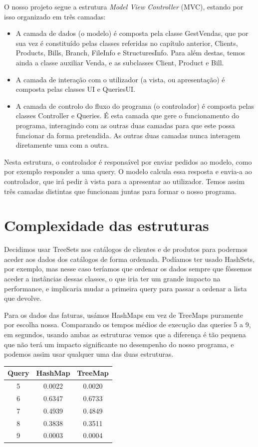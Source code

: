 \documentclass[a4paper]{report}
\begin{document}
	O nosso projeto segue a estrutura \textit{Model View Controller} (MVC), estando por isso organizado em três camadas:
	\begin{itemize}
		\item A camada de dados (o modelo) é composta pela classe GestVendas, que por sua vez é constituído pelas classes referidas no capítulo anterior, Clients, Products, Bills, Branch, FileInfo e StructuresInfo. Para além destas, temos ainda a classe auxiliar Venda, e as subclasses Client, Product e Bill.
		\item A camada de interação com o utilizador (a vista, ou apresentação) é composta pelas classes UI e QueriesUI.
		\item A camada de controlo do fluxo do programa (o controlador) é composta pelas classes Controller e Queries. É esta camada que gere o funcionamento do programa, interagindo com as outras duas camadas para que este possa funcionar da forma pretendida. As outras duas camadas nunca interagem diretamente uma com a outra.
	\end{itemize}
	Nesta estrutura, o controlador é responsável por enviar pedidos ao modelo, como por exemplo responder a uma query. O modelo calcula essa resposta e envia-a ao controlador, que irá pedir à vista para a apresentar ao utilizador. Temos assim três camadas distintas que funcionam juntas para formar o nosso programa.

	\chapter{Complexidade das estruturas}
	
	Decidimos usar TreeSets nos catálogos de clientes e de produtos para podermos aceder aos dados dos catálogos de forma ordenada. Podíamos ter usado HashSets, por exemplo, mas nesse caso teríamos que ordenar os dados sempre que fôssemos aceder a instâncias dessas classes, o que iria ter um grande impacto na performance, e implicaria mudar a primeira query para passar a ordenar a lista que devolve.
	
	Para os dados das faturas, usámos HashMaps em vez de TreeMaps puramente por escolha nossa. Comparando os tempos médios de execução das queries 5 a 9, em segundos, usando ambas as estruturas vemos que a diferença é tão pequena que não terá um impacto significante no desempenho do nosso programa, e podemos assim usar qualquer uma das duas estruturas.
	\begin{center}
		\begin{tabular}[pos]{| c | c | c |}
			\hline
			Query & HashMap & TreeMap \\ \hline
			5 & 0.0022 & 0.0020 \\ \hline
			6 & 0.6347 & 0.6733 \\ \hline
			7 & 0.4939 & 0.4849 \\ \hline
			8 & 0.3838 & 0.3511 \\ \hline
			9 & 0.0003 & 0.0004 \\ \hline
		\end{tabular}
	\end{center}
	
\end{document}
